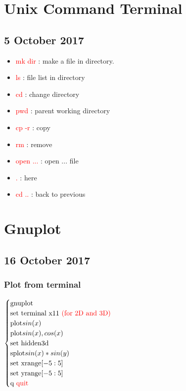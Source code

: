 \documentclass[a4paper,10pt]{article}
\begin{document}
\newpage
\section{Unix Command Terminal}

\subsection{5 October 2017}
\begin{itemize}
	\item \textcolor{red}{mk dir} : make a file in directory.
	\item \textcolor{red}{ls} : file list in directory
	\item \textcolor{red}{cd} : change directory
	\item \textcolor{red}{pwd} : parent working directory
	\item \textcolor{red}{cp -r} : copy
	\item \textcolor{red}{rm} : remove
	\item \textcolor{red}{open ...} : open ... file
	\item \textcolor{red}{.} : here
	\item \textcolor{red}{cd ..} : back to previous
\end{itemize}
\newpage
\section{Gnuplot}

\subsection{16 October 2017}
\subsubsection{Plot from terminal}
$ \begin{cases}
	\text{gnuplot} \\
	\text{set terminal x11 \textcolor{red}{(for 2D and 3D)}} \\
	\text{plot} sin(x) \\
	\text{plot} sin(x), cos(x) \\
	\text{set hidden3d} \\
	\text{splot} sin(x)*sin(y) \\
	\text{set xrange}[-5:5] \\
	\text{set yrange}[-5:5] \\
	\text{q \textcolor{red}{quit}}	
\end{cases} $
\end{document}
